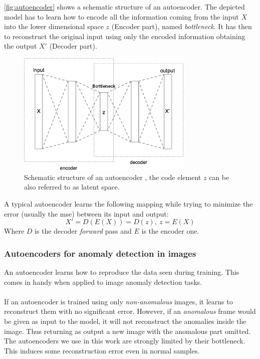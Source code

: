 \autoref{fig:autoencoder} shows a schematic structure of an autoencoder. The depicted model has to learn how to encode all the information coming from the input $X$ into the lower dimensional space $z$ (Encoder part), named \emph{bottleneck}. It has then to reconstruct the original input using only the encoded information obtaining the output $X'$ (Decoder part).

\begin{figure}[htbp]
    \centering
    \centerline{\includegraphics[width=0.75\textwidth]{img/Autoencoder_structure.png}}
    \caption[Autoencoder Structure]{Schematic structure of an autoencoder \cite{autoencoder.pic}, the code element $z$ can be also referred to as latent space.}
    \label{fig:autoencoder}
\end{figure}

A typical autoencoder learns the following mapping while trying to minimize the error (usually the \acrfull{mse}) between its input and output:
\begin{equation}
    X' = D(E(X)) = D(z),~z = E(X)
\end{equation}
Where $D$ is the decoder \emph{forward} pass and $E$ is the encoder one.

\subsubsection{Autoencoders for anomaly detection in images}
An autoencoder learns how to reproduce the data seen during training. This comes in handy when applied to image anomaly detection tasks.
\\
\\
If an autoencoder is trained using only \emph{non-anomalous} images, it learns to reconstruct them with no significant error. However, if an \emph{anomalous} frame would be given as input to the model, it will not reconstruct the anomalies inside the image. Thus returning as output a new image with the anomalous part omitted. The autoencoders we use in this work are strongly limited by their bottleneck. This induces some reconstruction error even in normal samples.

